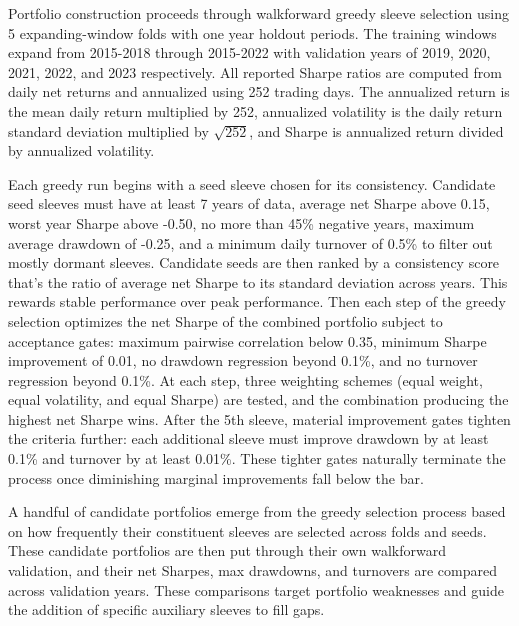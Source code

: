 \documentclass{article}
\begin{document}
Portfolio construction proceeds through walkforward greedy sleeve selection using 5 expanding-window folds with one year holdout periods. The training windows expand from 2015-2018 through 2015-2022 with validation years of 2019, 2020, 2021, 2022, and 2023 respectively. All reported Sharpe ratios are computed from daily net returns and annualized using 252 trading days. The annualized return is the mean daily return multiplied by 252, annualized volatility is the daily return standard deviation multiplied by $\sqrt{252}$, and Sharpe is annualized return divided by annualized volatility.

Each greedy run begins with a seed sleeve chosen for its consistency. Candidate seed sleeves must have at least 7 years of data, average net Sharpe above 0.15, worst year Sharpe above -0.50, no more than 45\% negative years, maximum average drawdown of -0.25, and a minimum daily turnover of 0.5\% to filter out mostly dormant sleeves. Candidate seeds are then ranked by a consistency score that's the ratio of average net Sharpe to its standard deviation across years. This rewards stable performance over peak performance. Then each step of the greedy selection optimizes the net Sharpe of the combined portfolio subject to acceptance gates: maximum pairwise correlation below 0.35, minimum Sharpe improvement of 0.01, no drawdown regression beyond 0.1\%, and no turnover regression beyond 0.1\%. At each step, three weighting schemes (equal weight, equal volatility, and equal Sharpe) are tested, and the combination producing the highest net Sharpe wins. After the 5th sleeve, material improvement gates tighten the criteria further: each additional sleeve must improve drawdown by at least 0.1\% and turnover by at least 0.01\%. These tighter gates naturally terminate the process once diminishing marginal improvements fall below the bar.

A handful of candidate portfolios emerge from the greedy selection process based on how frequently their constituent sleeves are selected across folds and seeds. These candidate portfolios are then put through their own walkforward validation, and their net Sharpes, max drawdowns, and turnovers are compared across validation years. These comparisons target portfolio weaknesses and guide the addition of specific auxiliary sleeves to fill gaps.
\end{document}
